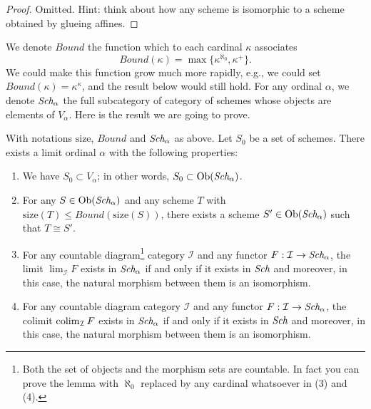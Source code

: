 \begin{proof}
Omitted. Hint: think about how any scheme is isomorphic to a scheme
obtained by glueing affines.
\end{proof}

\noindent
We denote $Bound$ the function which to each
cardinal $\kappa$ associates
\begin{equation}
\label{equation-bound}
Bound(\kappa) = \max\{\kappa^{\aleph_0}, \kappa^+\}.
\end{equation}
We could make this function grow much more rapidly, e.g., we could
set $Bound(\kappa) = \kappa^\kappa$, and the result below would still hold.
For any ordinal $\alpha$, we denote $\textit{Sch}_\alpha$ the full
subcategory of category of schemes whose objects are elements of
$V_\alpha$. Here is the result we are going to prove.

\begin{lemma}
\label{lemma-construct-category}
With notations $\text{size}$, $Bound$ and $\textit{Sch}_\alpha$ as above.
Let $S_0$ be a set of schemes. There exists a limit ordinal
$\alpha$ with the following properties:
\begin{enumerate}
\item We have $S_0 \subset V_\alpha$; in other words,
$S_0 \subset \mathop{\rm Ob}\nolimits(\textit{Sch}_\alpha)$.
\label{item-inclusion}
\item For any $S \in \mathop{\rm Ob}\nolimits(\textit{Sch}_\alpha)$ and any
scheme $T$ with $\text{size}(T) \leq Bound(\text{size}(S))$,
there exists a scheme $S' \in \mathop{\rm Ob}\nolimits(\textit{Sch}_\alpha)$
such that $T \cong S'$.
\label{item-bounded}
\item For any countable diagram\footnote{Both the set of objects and
the morphism sets are countable. In fact you can prove the lemma with
$\aleph_0$ replaced by any cardinal whatsoever in (3) and (4).}
category $\mathcal{I}$ and
any functor $F : \mathcal{I} \to \textit{Sch}_\alpha$, the limit
$\lim_\mathcal{I} F$ exists in $\textit{Sch}_\alpha$ if and
only if it exists in $\textit{Sch}$ and moreover, in this case,
the natural morphism between them is an isomorphism.
\label{item-limit}
\item For any countable diagram category $\mathcal{I}$ and
any functor $F : \mathcal{I} \to \textit{Sch}_\alpha$, the colimit
$\mathop{\rm colim}\nolimits_\mathcal{I} F$ exists in $\textit{Sch}_\alpha$ if and
only if it exists in $\textit{Sch}$ and moreover, in this case,
the natural morphism between them is an isomorphism.
\label{item-colimit}
\end{enumerate}
\end{lemma}

